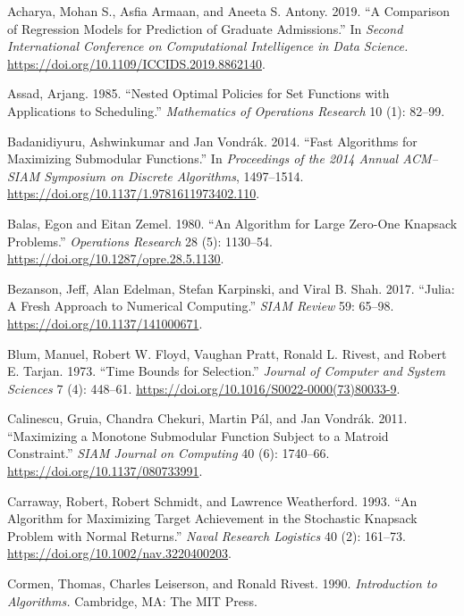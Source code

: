 \documentclass[11pt]{article} %
\theoremstyle{definition}
\theoremstyle{definition}
\begin{document}
Acharya, Mohan S., Asfia Armaan, and Aneeta S. Antony. 2019. ``A Comparison of Regression Models for Prediction of Graduate Admissions.'' In \emph{Second International Conference on Computational Intelligence in Data Science.} \url{https://doi.org/10.1109/ICCIDS.2019.8862140}.

Assad, Arjang. 1985. ``Nested Optimal Policies for Set Functions with Applications to Scheduling.'' \emph{Mathematics of Operations Research} 10 (1): 82--99.

Badanidiyuru, Ashwinkumar and Jan Vondrák. 2014. ``Fast Algorithms for Maximizing Submodular Functions.'' In \emph{Proceedings of the 2014 Annual ACM--SIAM Symposium on Discrete Algorithms}, 1497--1514. \url{https://doi.org/10.1137/1.9781611973402.110}.

Balas, Egon and Eitan Zemel. 1980. ``An Algorithm for Large Zero-One Knapsack Problems.'' \emph{Operations Research} 28 (5): 1130--54. \url{https://doi.org/10.1287/opre.28.5.1130}. 

Bezanson, Jeff, Alan Edelman, Stefan Karpinski, and Viral B. Shah. 2017. ``Julia: A Fresh Approach to Numerical Computing.'' \emph{SIAM Review} 59: 65–98. \url{https://doi.org/10.1137/141000671}.

Blum,  Manuel, Robert W. Floyd, Vaughan Pratt, Ronald L. Rivest, and Robert E. Tarjan. 1973. ``Time Bounds for Selection.'' \emph{Journal of Computer and System Sciences} 7 (4): 448--61. \url{https://doi.org/10.1016/S0022-0000(73)80033-9}.


Calinescu, Gruia, Chandra Chekuri, Martin Pál, and Jan Vondrák. 2011. ``Maximizing a Monotone Submodular Function Subject to a Matroid Constraint.'' \emph{SIAM Journal on Computing} 40 (6): 1740--66. \url{https://doi.org/10.1137/080733991}.

Carraway, Robert, Robert Schmidt, and Lawrence Weatherford. 1993. ``An Algorithm for Maximizing Target Achievement in the Stochastic Knapsack Problem with Normal Returns.'' \emph{Naval Research Logistics} 40 (2): 161--73. \url{https://doi.org/10.1002/nav.3220400203}.

Cormen, Thomas, Charles Leiserson, and Ronald Rivest. 1990. \emph{Introduction to Algorithms.} Cambridge, MA: The MIT Press.
\end{document}
